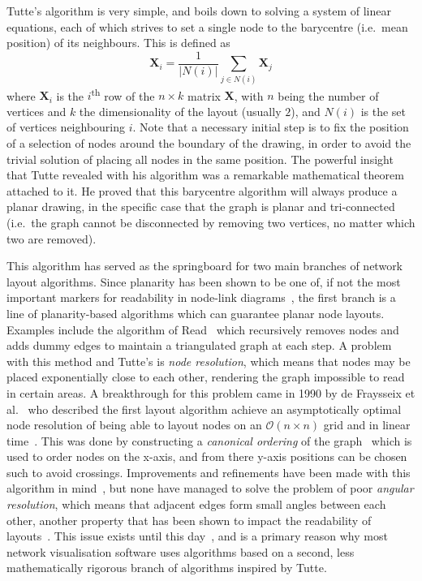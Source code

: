 Tutte's algorithm is very simple, and boils down to solving a system of linear equations, each of which strives to set a single node to the barycentre (i.e.\ mean position) of its neighbours. This is defined as 
\begin{equation}
    \mathbf{X}_i = \frac{1}{|N(i)|}\sum_{j\in N(i)}\mathbf{X}_j
\label{eq:tutte}
\end{equation}
where $\mathbf{X}_i$ is the $i$\textsuperscript{th} row of the $n\times k$ matrix $\mathbf{X}$, with $n$ being the number of vertices and $k$ the dimensionality of the layout (usually $2$), and $N(i)$ is the set of vertices neighbouring $i$.
Note that a necessary initial step is to fix the position of a selection of nodes around the boundary of the drawing, in order to avoid the trivial solution of placing all nodes in the same position.
The powerful insight that Tutte revealed with his algorithm was a remarkable mathematical theorem attached to it. He proved that this barycentre algorithm will always produce a planar drawing, in the specific case that the graph is planar and tri-connected (i.e.\ the graph cannot be disconnected by removing two vertices, no matter which two are removed).

This algorithm has served as the springboard for two main branches of network layout algorithms. Since planarity has been shown to be one of, if not the most important markers for readability in node-link diagrams~\cite{Purchase1997}, the first branch is a line of planarity-based algorithms which can guarantee planar node layouts. Examples include the algorithm of Read~\cite{Read1987} which recursively removes nodes and adds dummy edges to maintain a triangulated graph at each step.  A problem with this method and Tutte's is \emph{node resolution}, which means that nodes may be placed exponentially close to each other, rendering the graph impossible to read in certain areas.
A breakthrough for this problem came in 1990 by de Fraysseix et al.~\cite{DeFraysseix1990} who described the first layout algorithm achieve an asymptotically optimal node resolution of being able to layout nodes on an $\mathcal{O}(n\times n)$ grid and in linear time~\cite{Chrobak1995}. This was done by constructing a \emph{canonical ordering} of the graph~\cite{Zhang2005} which is used to order nodes on the x-axis, and from there y-axis positions can be chosen such to avoid crossings.
Improvements and refinements have been made with this algorithm in mind~\cite{Zhang2005}, but none have managed to solve the problem of poor \emph{angular resolution}, which means that adjacent edges form small angles between each other, another property that has been shown to impact the readability of layouts~\cite{Purchase1997}.
This issue exists until this day~\cite{Eades2012}, and is a primary reason why most network visualisation software uses algorithms based on a second, less mathematically rigorous branch of algorithms inspired by Tutte.


